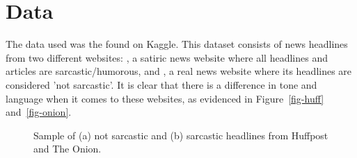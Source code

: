 \thispagestyle{plain}

\section{Data}

The data used was  the \href{https://www.kaggle.com/rmisra/news-headlines-dataset-for-sarcasm-detection}{\color{blue}{News Headlines Dataset For Sarcasm Detection}}\citep{misra2019sarcasm} found on Kaggle.  This dataset consists of news headlines from two different websites: \href{https://www.theonion.com}{\color{blue}{The Onion}}, a satiric news website where all headlines and articles are sarcastic/humorous, and \href{https://www.huffpost.com}{\color{blue}{Huffpost}}, a real news website where its headlines are considered 'not sarcastic'. It is clear that there is a difference in tone and language when it comes to these websites, as evidenced in Figure~\ref{fig-huff} and~\ref{fig-onion}. 

\begin{figure}[!htb]
	\centering
	\hfill
	\caption{Sample of (a) not sarcastic and (b) sarcastic headlines from Huffpost and The Onion.}
\end{figure}

